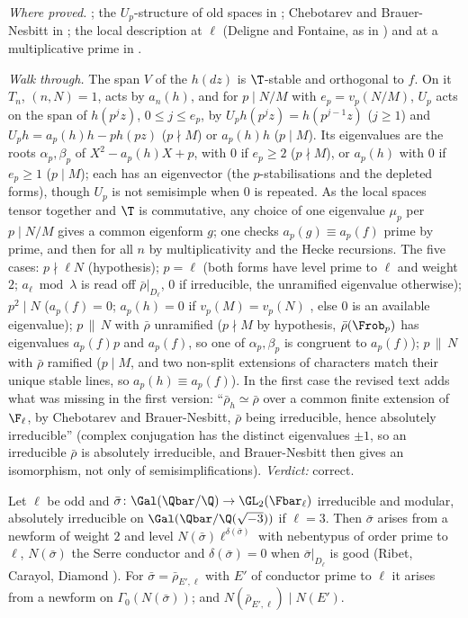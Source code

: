 \begin{sloppypar}
\noindent\emph{Where proved.} ; the $U_p$-structure of old spaces in ; Chebotarev and Brauer-Nesbitt in ; the local
description at $\ell$ (Deligne and Fontaine, as in \cite[Section 2]{Edixhoven92}) and at a multiplicative prime \cite[Theorem 3.1(e)]{DDT} in .

\emph{Walk through.} The span $V$ of the $h(dz)$ is $\T$-stable and orthogonal to $f$. On it $T_n$, $(n,N)=1$, acts by $a_n(h)$, and for $p\mid N/M$ with $e_p=v_p(N/M)$, $U_p$ acts on
the span of $h(p^jz)$, $0\le j\le e_p$, by $U_ph(p^jz)=h(p^{j-1}z)$ ($j\ge1$) and $U_ph=a_p(h)h-ph(pz)$ ($p\nmid M$) or $a_p(h)h$ ($p\mid M$). Its eigenvalues are the roots $\alpha_p,\beta_p$ of
$X^2-a_p(h)X+p$, with $0$ if $e_p\ge2$ ($p\nmid M$), or $a_p(h)$ with $0$ if $e_p\ge1$ ($p\mid M$); each has an eigenvector (the $p$-stabilisations and the depleted forms), though
$U_p$ is not semisimple when $0$ is repeated. As the local spaces tensor together and $\T$ is commutative, any choice of one eigenvalue $\mu_p$ per $p\mid N/M$ gives a
common eigenform $g$; one checks $a_p(g)\equiv a_p(f)$ prime by prime, and then for all $n$ by multiplicativity and the Hecke recursions. The five cases: $p\nmid\ell N$
(hypothesis); $p=\ell$ (both forms have level prime to $\ell$ and weight $2$; $a_\ell\bmod\lambda$ is read off $\bar\rho|_{D_\ell}$, $0$ if irreducible, the unramified eigenvalue otherwise);
$p^2\mid N$ ($a_p(f)=0$; $a_p(h)=0$ if $v_p(M)=v_p(N)$ \cite[Theorem 3]{AtkinLehner70}, else $0$ is an available eigenvalue); $p\,\|\,N$ with $\bar\rho$ unramified ($p\nmid M$ by hypothesis,
$\bar\rho(\Frob_p)$ has eigenvalues $a_p(f)p$ and $a_p(f)$, so one of $\alpha_p,\beta_p$ is congruent to $a_p(f)$); $p\,\|\,N$ with $\bar\rho$ ramified ($p\mid M$, and two non-split extensions
of characters match their unique stable lines, so $a_p(h)\equiv a_p(f)$). In the first case the revised text adds what was missing in the first version: ``$\bar\rho_h\simeq\bar\rho$
over a common finite extension of $\F_\ell$, by Chebotarev and Brauer-Nesbitt, $\bar\rho$ being irreducible, hence absolutely irreducible'' (complex conjugation has the
distinct eigenvalues $\pm1$, so an irreducible $\bar\rho$ is absolutely irreducible, and Brauer-Nesbitt then gives an isomorphism, not only of semisimplifications).
\emph{Verdict:} correct.

\begin{theorem}\label{thm:paper:optimal-level}
Let $\ell$ be odd and $\bar\sigma\colon\Gal(\Qbar/\Q)\to\GL_2(\Fbar_\ell)$ irreducible and modular, absolutely irreducible on $\Gal(\Qbar/\Q(\sqrt{-3}))$ if $\ell=3$. Then $\bar\sigma$ arises from a
newform of weight $2$ and level $N(\bar\sigma)\ell^{\delta(\bar\sigma)}$ with nebentypus of order prime to $\ell$, $N(\bar\sigma)$ the Serre conductor and $\delta(\bar\sigma)=0$ when $\bar\sigma|_{D_\ell}$ is good
\cite[Theorem 3.15]{DDT} (Ribet, Carayol, Diamond \cite{Ribet90,Carayol89,Diamond95}). For $\bar\sigma=\bar\rho_{E',\ell}$ with $E'$ of conductor prime to $\ell$ it arises from a newform on
$\Gamma_0(N(\bar\sigma))$; and $N(\bar\rho_{E',\ell})\mid N(E')$.
\end{theorem}


\end{sloppypar}
